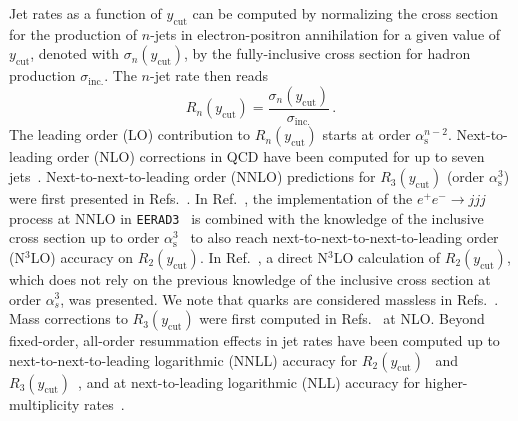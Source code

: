 \documentclass[10pt,aps,prl,superscriptaddress,twocolumn,preprintnumbers,nofootinbib]{revtex4-2}
\newcommand{\ycut}{y_{\mathrm{cut}}}
\newcommand{\alphas}{\alpha_{\mathrm{s}}}
\begin{document}
Jet rates as a function of $\ycut$ can be computed by normalizing the cross section for the production of $n$-jets in electron-positron annihilation for a given value of $\ycut$, denoted with $\sigma_n(\ycut)$, by the fully-inclusive cross section for hadron production $\sigma_{\text{inc.}}$. The $n$-jet rate then reads
\begin{equation}
\label{eq:jet_rate}
R_n(\ycut) = \frac{\sigma_n(\ycut)}{\sigma_{\text{inc.}}}\,.
\end{equation}
The leading order (LO) contribution to $R_n(\ycut)$ starts at order $\alphas^{n-2}$. Next-to-leading order (NLO) corrections in QCD have been computed for up to seven jets~\cite{Ellis:1980wv,Kunszt:1980vt,Vermaseren:1980qz,Fabricius:1981sx,Campbell:1998nn,Dixon:1997th,Nagy:1997yn,Frederix:2010ne,Becker:2011vg}. Next-to-next-to-leading order (NNLO) predictions for $R_3(\ycut)$ (order $\alphas^3$) were first presented in Refs.~\cite{Gehrmann-DeRidder:2008qsl,Weinzierl:2008iv}. In Ref.~\cite{Gehrmann-DeRidder:2008qsl}, the implementation of the $e^+e^-\to jjj$ process at NNLO in \texttt{EERAD3}~\cite{Gehrmann-DeRidder:2014hxk,Aveleira:2025svg} is combined with the knowledge of the inclusive cross section up to order $\alphas^3$~\cite{Gorishnii:1990vf,Surguladze:1990tg,Chetyrkin:1996ela} to also reach next-to-next-to-next-to-leading order (N$^3$LO) accuracy on $R_2(\ycut)$. In Ref.~\cite{Chen:2025kez}, a direct N$^3$LO calculation of $R_2(\ycut)$, which does not rely on the previous knowledge of the inclusive cross section at order $\alpha_s^3$, was presented. We note that quarks are considered massless in Refs.~\cite{Gehrmann-DeRidder:2008qsl,Weinzierl:2008iv,Chen:2025kez}. Mass corrections to $R_3(\ycut)$ were first computed in Refs.~\cite{Brandenburg:1997pu,Nason:1997nw,Rodrigo:1997gy} at NLO. Beyond fixed-order, all-order resummation effects in jet rates have been computed up to next-to-next-to-leading logarithmic (NNLL) accuracy for $R_2(\ycut)$~\cite{Banfi:2016zlc} and $R_3(\ycut)$~\cite{vanBeekveld:2024wws}, and at next-to-leading logarithmic (NLL) accuracy for higher-multiplicity rates~\cite{Nagy:1998kw,Baberuxki:2019ifp}.
\end{document}
